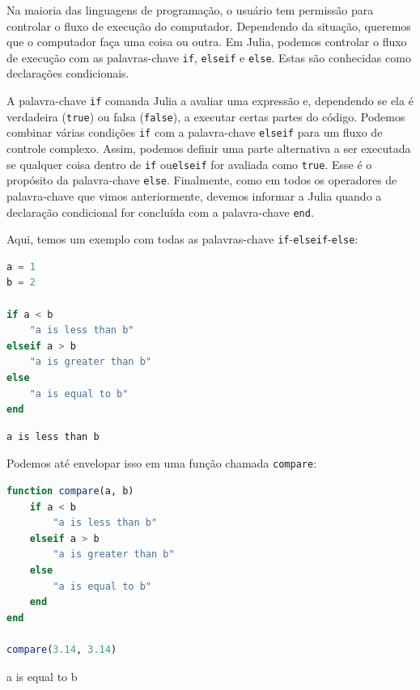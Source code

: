 \documentclass[
  notoc %
]{tufte-book}
\newcommand{\passthrough}[1]{#1}
\begin{document}
Na maioria das linguagens de programação, o usuário tem permissão para
controlar o fluxo de execução do computador. Dependendo da situação,
queremos que o computador faça uma coisa ou outra. Em Julia, podemos
controlar o fluxo de execução com as palavras-chave
\passthrough{\lstinline!if!}, \passthrough{\lstinline!elseif!} e
\passthrough{\lstinline!else!}. Estas são conhecidas como declarações
condicionais.

A palavra-chave \passthrough{\lstinline!if!} comanda Julia a avaliar uma
expressão e, dependendo se ela é verdadeira
(\passthrough{\lstinline!true!}) ou falsa
(\passthrough{\lstinline!false!}), a executar certas partes do código.
Podemos combinar várias condições \passthrough{\lstinline!if!} com a
palavra-chave \passthrough{\lstinline!elseif!} para um fluxo de controle
complexo. Assim, podemos definir uma parte alternativa a ser executada
se qualquer coisa dentro de \passthrough{\lstinline!if!}
ou\passthrough{\lstinline!elseif!} for avaliada como
\passthrough{\lstinline!true!}. Esse é o propósito da palavra-chave
\passthrough{\lstinline!else!}. Finalmente, como em todos os operadores
de palavra-chave que vimos anteriormente, devemos informar a Julia
quando a declaração condicional for concluída com a palavra-chave
\passthrough{\lstinline!end!}.

Aqui, temos um exemplo com todas as palavras-chave
\passthrough{\lstinline!if!}-\passthrough{\lstinline!elseif!}-\passthrough{\lstinline!else!}:

\begin{lstlisting}[language=Julia]
a = 1
b = 2

if a < b
    "a is less than b"
elseif a > b
    "a is greater than b"
else
    "a is equal to b"
end
\end{lstlisting}

\begin{lstlisting}[language=Output]
a is less than b
\end{lstlisting}

Podemos até envelopar isso em uma função chamada
\passthrough{\lstinline!compare!}:

\begin{lstlisting}[language=Julia]
function compare(a, b)
    if a < b
        "a is less than b"
    elseif a > b
        "a is greater than b"
    else
        "a is equal to b"
    end
end

compare(3.14, 3.14)
\end{lstlisting}

a is equal to b
\end{document}
